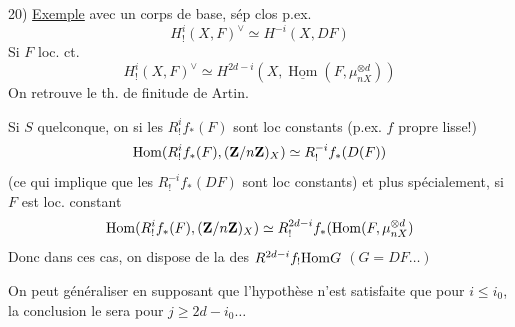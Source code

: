 20) \uline{Exemple}  avec un corps de base, sép clos p.ex.
\[
H^i_!(X,F)^\vee\simeq H^{-i}(X,DF)
\]
Si $F$ loc. ct.
\[
H^i_!(X,F)^\vee\simeq H^{2d-i}(X,\underline{\operatorname{Hom}}(F,\mu_{nX}^{\otimes d}))
\]
On retrouve le th. de finitude de Artin.

Si $S$ quelconque, on  si les $R^i_!f_*(F)$ sont loc constants (p.ex. $f$ propre lisse!)
\[
\operatorname{Hom}(R^i_!f_*(F),(\mathbf{Z}/n\mathbf{Z})_X)\simeq R^{-i}_{\relax{!}}f_*(D(F))
\]
(ce qui implique que les $R^{-i}_!f_*(DF)$ sont loc constants) et plus spécialement, si $F$ est loc. constant
\[
\operatorname{Hom}(R^i_!f_*(F),(\mathbf{Z}/n\mathbf{Z})_X)\simeq R^{2d-i}_{\relax{!}}f_*(\operatorname{Hom}(F,\mu_{nX}^{\otimes d})
\]
Donc dans ces cas, on dispose de la  des $R^{\relax{\relax{2d-i}}}f_{\relax{!}}\relax{\operatorname{Hom}}G$ $(G=DF\ldots)$

On peut généraliser en supposant que l'hypothèse n'est satisfaite que pour $i\leq i_0$, la conclusion le sera pour $j\geq2d-i_0\ldots$
